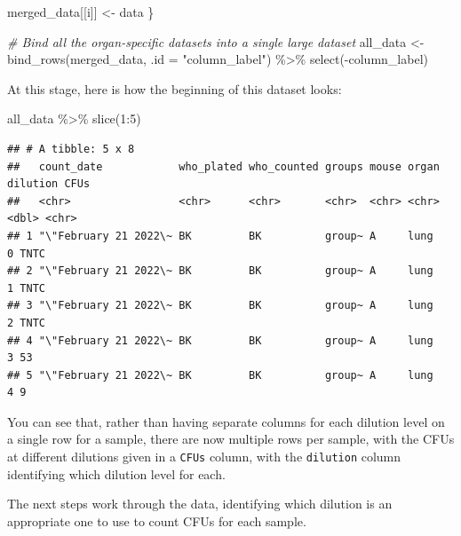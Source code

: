 \documentclass[
]{book}
\newenvironment{Shaded}{\begin{snugshade}}{\end{snugshade}}
\newcommand{\AttributeTok}[1]{\textcolor[rgb]{0.77,0.63,0.00}{#1}}
\newcommand{\CommentTok}[1]{\textcolor[rgb]{0.56,0.35,0.01}{\textit{#1}}}
\newcommand{\DecValTok}[1]{\textcolor[rgb]{0.00,0.00,0.81}{#1}}
\newcommand{\FunctionTok}[1]{\textcolor[rgb]{0.00,0.00,0.00}{#1}}
\newcommand{\NormalTok}[1]{#1}
\newcommand{\OtherTok}[1]{\textcolor[rgb]{0.56,0.35,0.01}{#1}}
\newcommand{\SpecialCharTok}[1]{\textcolor[rgb]{0.00,0.00,0.00}{#1}}
\newcommand{\StringTok}[1]{\textcolor[rgb]{0.31,0.60,0.02}{#1}}
\begin{document}
\begin{Shaded}
\begin{Highlighting}[]
\NormalTok{  merged\_data[[i]] }\OtherTok{\textless{}{-}}\NormalTok{ data}
\NormalTok{\}}

\CommentTok{\# Bind all the organ{-}specific datasets into a single large dataset}
\NormalTok{all\_data }\OtherTok{\textless{}{-}} \FunctionTok{bind\_rows}\NormalTok{(merged\_data, }\AttributeTok{.id =} \StringTok{"column\_label"}\NormalTok{) }\SpecialCharTok{\%\textgreater{}\%} 
    \FunctionTok{select}\NormalTok{(}\SpecialCharTok{{-}}\NormalTok{column\_label)}
\end{Highlighting}
\end{Shaded}

At this stage, here is how the beginning of this dataset looks:

\begin{Shaded}
\begin{Highlighting}[]
\NormalTok{all\_data }\SpecialCharTok{\%\textgreater{}\%} 
  \FunctionTok{slice}\NormalTok{(}\DecValTok{1}\SpecialCharTok{:}\DecValTok{5}\NormalTok{)}
\end{Highlighting}
\end{Shaded}

\begin{verbatim}
## # A tibble: 5 x 8
##   count_date            who_plated who_counted groups mouse organ dilution CFUs 
##   <chr>                 <chr>      <chr>       <chr>  <chr> <chr>    <dbl> <chr>
## 1 "\"February 21 2022\~ BK         BK          group~ A     lung         0 TNTC 
## 2 "\"February 21 2022\~ BK         BK          group~ A     lung         1 TNTC 
## 3 "\"February 21 2022\~ BK         BK          group~ A     lung         2 TNTC 
## 4 "\"February 21 2022\~ BK         BK          group~ A     lung         3 53   
## 5 "\"February 21 2022\~ BK         BK          group~ A     lung         4 9
\end{verbatim}

You can see that, rather than having separate columns for each dilution level
on a single row for a sample, there are now multiple rows per sample, with the
CFUs at different dilutions given in a \texttt{CFUs} column, with the \texttt{dilution} column
identifying which dilution level for each.

The next steps work through the data, identifying which dilution is an
appropriate one to use to count CFUs for each sample.
\end{document}
